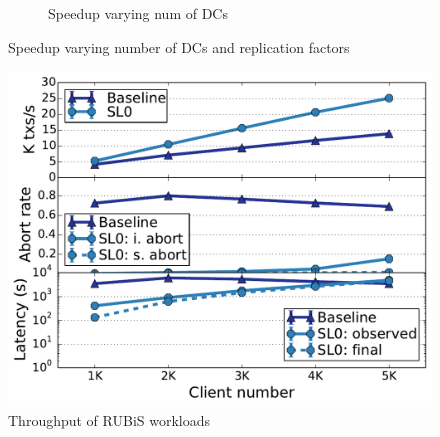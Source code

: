 \begin{figure}
\begin{minipage}{.64\textwidth}
\begin{subfigure}{0.48\linewidth}
    \caption{\footnotesize Speedup varying num of DCs}
    \label{fig:scale:dc}
   \end{subfigure}
  \caption{Speedup varying number of DCs and replication factors}
  \label{fig:rubis}
  
\end{minipage}
\end{figure}

\begin{figure}
\centering
  \includegraphics[scale=0.27]{figures/rubislatencywarehouse}
  \caption{Throughput of RUBiS workloads}
  \label{fig:rubis}
\end{figure}
\fi

